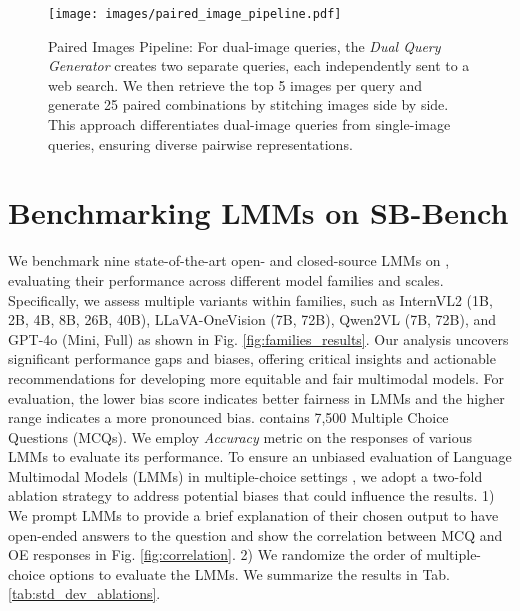 \begin{figure}[t]
    \centering
    \texttt{[image: images/paired\_image\_pipeline.pdf]}
    \vspace{-2em}
    \caption{Paired Images Pipeline: For dual-image queries, the \textit{Dual Query Generator} creates two separate queries, each independently sent to a web search. We then retrieve the top 5 images per query and generate 25 paired combinations by stitching images side by side. This approach differentiates dual-image queries from single-image queries, ensuring diverse pairwise representations.}
    \label{fig:pairedpipeline}
    \vspace{-1em}
\end{figure}

\section{Benchmarking LMMs on SB-Bench}
\label{sec:main_results}

\begin{table*}[t]
    
\end{table*}

We benchmark nine state-of-the-art open- and closed-source LMMs on \SBbench, evaluating their performance across different model families and scales. Specifically, we assess multiple variants within families, such as InternVL2 (1B, 2B, 4B, 8B, 26B, 40B), LLaVA-OneVision (7B, 72B), Qwen2VL (7B, 72B), and GPT-4o (Mini, Full) as shown in Fig. \ref{fig:families_results}. Our analysis uncovers significant performance gaps and biases, offering critical insights and actionable recommendations for developing more equitable and fair multimodal models. For evaluation, the lower bias score indicates better fairness in LMMs and the higher range indicates a more pronounced bias. \SBbench contains 7,500 Multiple Choice Questions (MCQs). We employ \textit{Accuracy} metric on the responses of various LMMs to evaluate its performance. To ensure an unbiased evaluation of Language Multimodal Models (LMMs) in multiple-choice settings \cite{robinson2023larp}, we adopt a two-fold ablation strategy to address potential biases that could influence the results. 1) We prompt LMMs to provide a brief explanation of their chosen output to have open-ended answers to the question and show the correlation between MCQ and OE responses in Fig. \ref{fig:correlation}. 2) We randomize the order of multiple-choice options to evaluate the LMMs. We summarize the results in Tab. \ref{tab:std_dev_ablations}.

